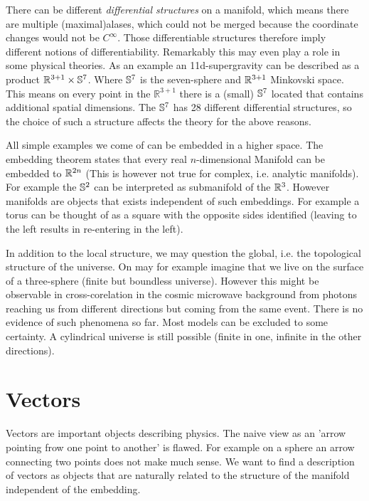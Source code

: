 \begin{sidenote}
There can be different \emph{differential structures} on a manifold, 
which means there are multiple (maximal)alases, which
could not be merged because the coordinate changes would not be $C^\infty$. Those differentiable structures therefore imply different notions of differentiability. 
Remarkably this may even play a role in some physical theories. 
As an example an 11d-supergravity can be described as a product
$\mathbb{R}^{3+1}\times \mathbb{S}^7$.
Where $\mathbb{S}^7$ is the seven-sphere and $\mathbb{R}^{3+1}$ Minkovski space.
This means on every point in the $\mathbb{R}^{3+1}$ there is a (small) $\mathbb{S}^7$  located that contains additional spatial dimensions. 
The $\mathbb{S}^7$ has 28 different differential structures, so the choice of
such a structure affects the theory for the above reasons.
\end{sidenote}
All simple examples we come of can be embedded in a higher space. The
 embedding theorem states that every real $n$-dimensional Manifold
can be embedded to $\mathbb{R}^{2n}$ (This is however not true for complex, i.e. analytic manifolds).
For example the $\mathbb{S}^2$ can be interpreted as submanifold of the
$\mathbb{R}^3$.
However manifolds are objects that exists independent of such embeddings. 
For example a torus can be thought of as a square with the opposite sides identified (leaving to the left results in re-entering in the left).
\begin{sidenote}
In addition to the local structure, we may question the global, i.e. the
topological structure of the universe.
On may for example imagine that we live on the surface of a three-sphere (finite
but boundless universe).
However this might be observable in cross-corelation in the cosmic microwave
background from photons reaching us from different directions but coming from the same event. There is no evidence of such phenomena so far. 
Most models can be excluded to some certainty. A cylindrical
universe is still possible (finite in one, infinite in the
other directions).
\end{sidenote}
\section{Vectors}
Vectors are important objects describing physics. The naive view as an 'arrow
pointing frow one point to another' is flawed.
For example on a sphere an arrow connecting two points does not make much sense.
We want to find a description of vectors as objects that are naturally related to the structure of the manifold independent of the embedding.
